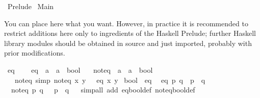 %
\begin{isabellebody}%
%
%
\isadelimtheory
\isanewline
\isanewline
\isanewline
%
\endisadelimtheory
%
\isatagtheory
{}\isamarkupfalse%
\ Prelude\isanewline
{}\ Main\isanewline
{}%
\endisatagtheory
{\isafoldtheory}%
%
\isadelimtheory
%
\endisadelimtheory
%
\begin{isamarkuptext}%
You can place here what you want.  However, in practice it
  is recommended to restrict additions here only to ingredients
  of the Haskell Prelude;  further Haskell library modules
  should be obtained in source and just imported, probably
  with prior modifications.%
\end{isamarkuptext}\isamarkuptrue%
%
\isamarkuptrue%
\isamarkupfalse%
\ eq\ {\isacharequal}\isanewline
\ \ \ eq\ {\isacharcolon}{\isacharcolon}\ {\isachardoublequoteopen}{\isacharprime}a\ {\isasymRightarrow}\ {\isacharprime}a\ {\isasymRightarrow}\ bool{\isachardoublequoteclose}\isanewline
\ \ \ not{\isacharunderscore}eq\ {\isacharcolon}{\isacharcolon}\ {\isachardoublequoteopen}{\isacharprime}a\ {\isasymRightarrow}\ {\isacharprime}a\ {\isasymRightarrow}\ bool{\isachardoublequoteclose}\isanewline
\ \ \ not{\isacharunderscore}eq\ {\isacharbrackleft}simp{\isacharbrackright}{\isacharcolon}\ {\isachardoublequoteopen}not{\isacharunderscore}eq\ x\ y\ {\isasymlongleftrightarrow}\ {\isasymnot}\ eq\ x\ y{\isachardoublequoteclose}\isanewline
\isanewline
{}\isamarkupfalse%
\ bool\ {\isacharcolon}{\isacharcolon}\ eq\isanewline
{}\isanewline
\isanewline
{}\isamarkupfalse%
\isanewline
\ \ {\isachardoublequoteopen}eq\ p\ q\ {\isasymlongleftrightarrow}\ {\isacharparenleft}p\ {\isasymlongleftrightarrow}\ q{\isacharparenright}{\isachardoublequoteclose}\isanewline
\isanewline
{}\isamarkupfalse%
\isanewline
\ \ {\isachardoublequoteopen}not{\isacharunderscore}eq\ p\ q\ {\isasymlongleftrightarrow}\ {\isasymnot}\ {\isacharparenleft}p\ {\isasymlongleftrightarrow}\ q{\isacharparenright}{\isachardoublequoteclose}\isanewline
\isanewline
{}\isamarkupfalse%
%
\isadelimproof
\ %
\endisadelimproof
%
\isatagproof
{}\isamarkupfalse%
\isanewline
{}\isamarkupfalse%
\ {\isacharparenleft}simp{\isacharunderscore}all\ add{\isacharcolon}\ eq{\isacharunderscore}bool{\isacharunderscore}def\ not{\isacharunderscore}eq{\isacharunderscore}bool{\isacharunderscore}def{\isacharparenright}%

\end{isabellebody}
